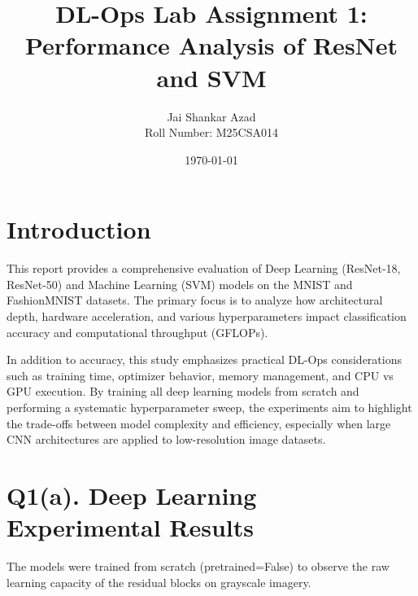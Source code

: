 \documentclass[a4paper,10pt,twocolumn]{article}
\title{\textbf{DL-Ops Lab Assignment 1: Performance Analysis of ResNet and SVM}}
\author{Jai Shankar Azad \\ Roll Number: M25CSA014}
\date{\today}
\begin{document}
\maketitle

\section{Introduction}
This report provides a comprehensive evaluation of Deep Learning (ResNet-18, ResNet-50) and Machine Learning (SVM) models on the MNIST and FashionMNIST datasets. The primary focus is to analyze how architectural depth, hardware acceleration, and various hyperparameters impact classification accuracy and computational throughput (GFLOPs).

In addition to accuracy, this study emphasizes practical DL-Ops considerations such as training time, optimizer behavior, memory management, and CPU vs GPU execution. By training all deep learning models from scratch and performing a systematic hyperparameter sweep, the experiments aim to highlight the trade-offs between model complexity and efficiency, especially when large CNN architectures are applied to low-resolution image datasets.


\section{Q1(a). Deep Learning Experimental Results}
The models were trained from scratch (pretrained=False) to observe the raw learning capacity of the residual blocks on grayscale imagery.
\end{document}
